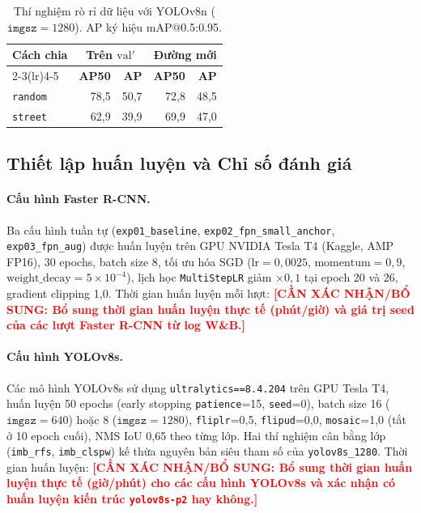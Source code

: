 \documentclass[11pt]{article}
\newcommand{\needconfirm}[1]{\textcolor{red}{\textbf{[CẦN XÁC NHẬN/BỔ SUNG: #1]}}}
\begin{document}
\begin{table}[t]
\centering
\small
\begin{tabular}{lrrrr}
\toprule
\multirow{2}{*}{\textbf{Cách chia}} & \multicolumn{2}{c}{\textbf{Trên $\text{val}'$}} & \multicolumn{2}{c}{\textbf{Đường mới}} \\
\cmidrule(lr){2-3}\cmidrule(lr){4-5}
 & \textbf{AP50} & \textbf{AP} & \textbf{AP50} & \textbf{AP} \\
\midrule
\texttt{random} & 78,5 & 50,7 & 72,8 & 48,5 \\
\texttt{street} & 62,9 & 39,9 & 69,9 & 47,0 \\
\bottomrule
\end{tabular}
\caption{Thí nghiệm rò rỉ dữ liệu với YOLOv8n ($\texttt{imgsz}=1280$). AP ký hiệu mAP@0.5:0.95.}
\label{tab:leak}
\end{table}

\subsection{Thiết lập huấn luyện và Chỉ số đánh giá}

\paragraph{Cấu hình Faster R-CNN.}
Ba cấu hình tuần tự (\texttt{exp01\_baseline}, \texttt{exp02\_fpn\_small\_anchor}, \texttt{exp03\_fpn\_aug}) được huấn luyện trên GPU NVIDIA Tesla T4 (Kaggle, AMP FP16), 30 epochs, batch size 8, tối ưu hóa SGD ($\text{lr}=0{,}0025$, $\text{momentum}=0{,}9$, $\text{weight\_decay}=5\times 10^{-4}$), lịch học \texttt{MultiStepLR} giảm $\times 0{,}1$ tại epoch 20 và 26, gradient clipping 1,0. Thời gian huấn luyện mỗi lượt: \needconfirm{Bổ sung thời gian huấn luyện thực tế (phút/giờ) và giá trị seed của các lượt Faster R-CNN từ log W\&B.}

\paragraph{Cấu hình YOLOv8s.}
Các mô hình YOLOv8s sử dụng \texttt{ultralytics==8.4.204} trên GPU Tesla T4, huấn luyện 50 epochs (early stopping \texttt{patience}=15, \texttt{seed}=0), batch size 16 ($\texttt{imgsz}=640$) hoặc 8 ($\texttt{imgsz}=1280$), \texttt{fliplr}=0,5, \texttt{flipud}=0,0, \texttt{mosaic}=1,0 (tắt ở 10 epoch cuối), NMS IoU 0,65 theo từng lớp. Hai thí nghiệm cân bằng lớp (\texttt{imb\_rfs}, \texttt{imb\_clspw}) kế thừa nguyên bản siêu tham số của \texttt{yolov8s\_1280}. Thời gian huấn luyện: \needconfirm{Bổ sung thời gian huấn luyện thực tế (giờ/phút) cho các cấu hình YOLOv8s và xác nhận có huấn luyện kiến trúc \texttt{yolov8s-p2} hay không.}
\end{document}
